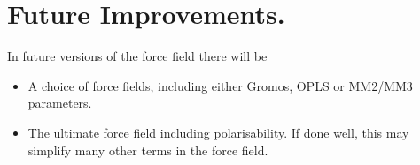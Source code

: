 \section{Future Improvements.}
{\undercons}
In future versions of the force field there will be
\begin{itemize}
\item   A choice of force fields, including either Gromos, OPLS or
        MM2/MM3 parameters. 
\item   The ultimate force field including polarisability. If done
        well, this may simplify many other terms in the force field. 
\end{itemize}
